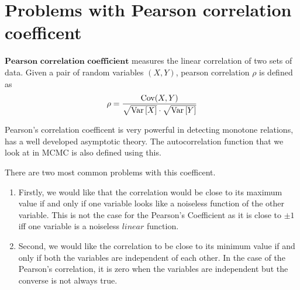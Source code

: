 \chapter{Problems with Pearson correlation coefficent}
\begin{definition}
	$\textbf{Pearson correlation coefficient}$ measures the linear correlation of two sets of data.
	Given a pair of random variables $(X, Y)$, pearson correlation $\rho$ is defined as
	$$\rho = \frac{\text{Cov}(X, Y)}{\sqrt{\text{Var}\left[{{X}}\right]} \cdot \sqrt{\text{Var}\left[{{Y}}\right]}}$$
\end{definition}

Pearson's correlation coefficent is very powerful in detecting monotone relations,
has a well developed asymptotic theory. The autocorrelation function that we look at in MCMC is also defined using this.
\newline

There are two most common problems with this coefficent.
\begin{enumerate}
	\item Firstly, we would like that the correlation would be close to its maximum value
	if and only if one variable looks like a noiseless function of the other variable.
	This is not the case for the Pearson's Coefficient as it is close to $\pm 1$ iff one variable is a noiseless $\textit{linear}$ function.
	\item Second, we would like the correlation to be close to its minimum value if and only if both the variables are independent of each other.
	In the case of the Pearson's correlation, it is zero when the variables are independent but the converse is not always true.
\end{enumerate}

